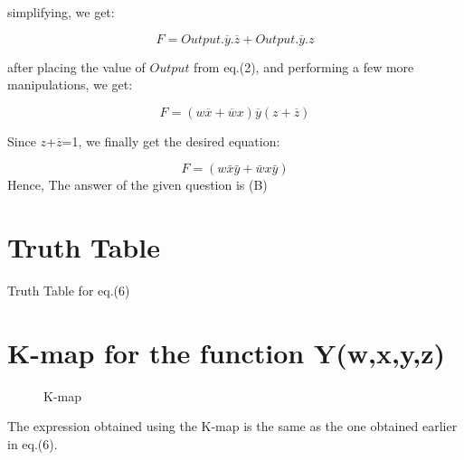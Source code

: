 \documentclass{article}
\begin{document}
simplifying, we get:

\begin{equation}
    F = Output.\overline{y}.\overline{z} + Output.\overline{y}.z
\end{equation}

after placing the value of $Output$ from eq.(2), and performing a few more manipulations, we get:

\begin{equation}
    F = (w\overline{x}+\overline{w}x)\overline{y}(z+\overline{z})
\end{equation}

Since $z$+$\overline{z}$=1, we finally get the desired equation:

\begin{equation}
    F = (w\bar{x}\bar{y}+\bar{w}x\bar{y})
\end{equation}
Hence, The answer of the given question is (B)


\section{Truth Table}
\begin{table}[!h]
\centering
\scalebox{1.6}{

}
\caption{Truth Table for eq.(6)}
\label{table1}
\end{table}
\section{K-map for the function Y(w,x,y,z)}
\hspace{2cm}
\begin{figure}[h]
\centering

\caption{K-map}
\label{kmap}
\end{figure}

The expression obtained using the K-map is the same as the one obtained earlier in eq.(6).
\end{document}
